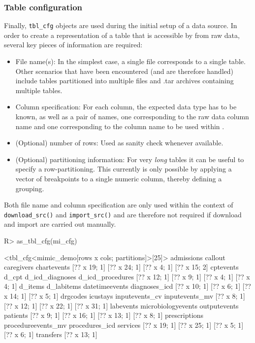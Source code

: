 \documentclass[
  notitle]{jss}
\begin{document}
\hypertarget{table-configuration}{%
\subsubsection{Table configuration}\label{table-configuration}}

Finally, \texttt{tbl\_cfg} objects are used during the initial setup of
a data source. In order to create a representation of a table that is
accessible by  from raw data, several key pieces of
information are required:

\begin{itemize}
\item
  File name(s): In the simplest case, a single file corresponds to a
  single table. Other scenarios that have been encountered (and are
  therefore handled) include tables partitioned into multiple files and
  .tar archives containing multiple tables.
\item
  Column specification: For each column, the expected data type has to
  be known, as well as a pair of names, one corresponding to the raw
  data column name and one corresponding to the column name to be used
  within .
\item
  (Optional) number of rows: Used as sanity check whenever available.
\item
  (Optional) partitioning information: For very \emph{long} tables it
  can be useful to specify a row-partitioning. This currently is only
  possible by applying a vector of breakpoints to a single numeric
  column, thereby defining a grouping.
\end{itemize}

Both file name and column specification are only used within the context
of \texttt{download\_src()} and \texttt{import\_src()} and are therefore
not required if download and import are carried out manually.

\begin{CodeChunk}
\begin{CodeInput}
R> as_tbl_cfg(mi_cfg)
\end{CodeInput}
\begin{CodeOutput}
<tbl_cfg<mimic_demo[rows x cols; partitions]>[25]>
        admissions            callout         caregivers        chartevents 
      [?? x 19; 1]       [?? x 24; 1]        [?? x 4; 1]       [?? x 15; 2] 
         cptevents              d_cpt    d_icd_diagnoses   d_icd_procedures 
      [?? x 12; 1]        [?? x 9; 1]        [?? x 4; 1]        [?? x 4; 1] 
           d_items         d_labitems     datetimeevents      diagnoses_icd 
      [?? x 10; 1]        [?? x 6; 1]       [?? x 14; 1]        [?? x 5; 1] 
          drgcodes           icustays     inputevents_cv     inputevents_mv 
       [?? x 8; 1]       [?? x 12; 1]       [?? x 22; 1]       [?? x 31; 1] 
         labevents microbiologyevents       outputevents           patients 
       [?? x 9; 1]       [?? x 16; 1]       [?? x 13; 1]        [?? x 8; 1] 
     prescriptions procedureevents_mv     procedures_icd           services 
      [?? x 19; 1]       [?? x 25; 1]        [?? x 5; 1]        [?? x 6; 1] 
         transfers 
      [?? x 13; 1] 
\end{CodeOutput}
\end{CodeChunk}
\end{document}
